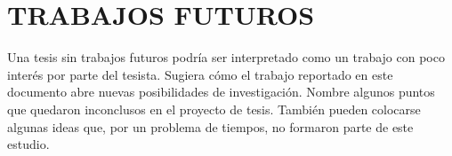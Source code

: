 \documentclass[../main.tex]{subfiles}
\begin{document}
\chapter*{\center \Large TRABAJOS FUTUROS} 

Una tesis sin trabajos futuros podría ser interpretado como un trabajo con poco interés por parte del tesista. Sugiera cómo el trabajo reportado en este documento abre nuevas posibilidades de investigación. Nombre algunos puntos que quedaron inconclusos en el proyecto de tesis. También pueden colocarse algunas ideas que, por un problema de tiempos, no formaron parte de este estudio. 
\end{document}

